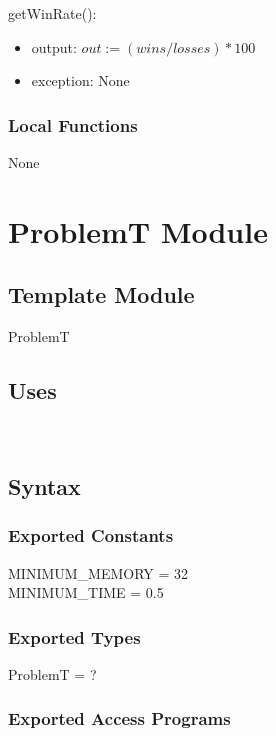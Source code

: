 \documentclass[12pt, titlepage]{article}
\begin{document}
\noindent getWinRate():
\begin{itemize}
\item output: $out := (wins / losses) * 100$
\item exception: None
\end{itemize}

\subsubsection{Local Functions}

None
\newpage

\newpage

\section{ProblemT Module} \label{ProblemT} 

\subsection{Template Module}

ProblemT

\subsection{Uses}
\\

\subsection{Syntax}

\subsubsection{Exported Constants}

MINIMUM\_MEMORY = 32\\
MINIMUM\_TIME = 0.5

\subsubsection{Exported Types}

ProblemT = ?

\subsubsection{Exported Access Programs}
\end{document}
